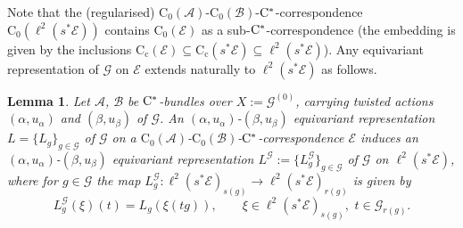 \documentclass[11 pt, leqno]{amsart}
\numberwithin{equation}{section}
\theoremstyle{plain}
\newtheorem {lem} [thm]{Lemma}
\theoremstyle{definition}
\newcommand*{\contc}{\mathrm{C_c}}%
\newcommand*{\contz}{\mathrm{C_0}}%
\newcommand{\B}{\mathcal B}
\newcommand{\G}{\mathcal G} %
\newcommand{\EE}{\mathcal E}
\newcommand{\A}{\mathcal A}
\newcommand{\cst}{\ifmmode\mathrm{C}^*\else{$\mathrm{C}^*$}\fi}
\begin{document}
Note that the (regularised) $\contz(\A)$-$\contz(\B)$-$\cst$-correspondence $\contz(\ell^2(s^*\EE))$ contains $\contz(\EE)$ as a sub-$\cst$-correspondence (the embedding is given by the inclusions $\contc(\EE)\subseteq \contc(s^*\EE)\subseteq \ell^2(s^*\EE)$). 
Any equivariant representation of $\G$ on $\EE$ extends naturally to $\ell^2(s^*\EE)$ as follows.

\begin{lem}\label{lem:induced_equivariant_representation}
Let $\A$, $\B$ be $\cst$-bundles over $X := \G^{(0)}$, carrying twisted actions $(\alpha,u_\alpha)$ and $(\beta,u_\beta)$ of $\G$. 
An $(\alpha,u_{\alpha})$-$(\beta,u_{\beta})$ equivariant representation $L = \{ L_g \}_{g \in \G}$ of $\G$ on a $\contz(\A)$-$\contz(\B)$-$\cst$-correspondence $\EE$ induces an $(\alpha,u_{\alpha})$-$(\beta,u_{\beta})$ equivariant representation $L^\G := \{ L^{\G}_g \}_{g \in \G}$ of $\G$ on $\ell^2(s^*\EE)$, where for $g \in \G$  the map $L^{\G}_{g}:\ell^2(s^*\EE)_{s(g)}\to \ell^2(s^*\EE)_{r(g)}$ is given by  
\begin{equation}\label{eq:induced-regular-rep}
    L^{\G}_{g}(\xi)(t) = L_g (\xi (t g)), \qquad 
    \xi\in \ell^2(s^*\EE)_{s(g)},\,\, t \in \G_{r(g)}.    
\end{equation}
\end{lem}
\end{document}
